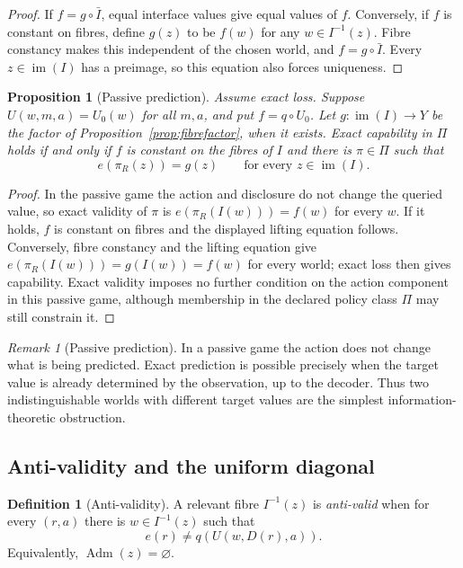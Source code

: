 \documentclass[11pt]{article}
\theoremstyle{plain}
\newtheorem{proposition}[theorem]{Proposition}
\theoremstyle{definition}
\newtheorem{definition}[theorem]{Definition}
\theoremstyle{remark}
\newtheorem{remark}[theorem]{Remark}
\newcommand{\im}{\operatorname{im}}
\newcommand{\Adm}{\operatorname{Adm}}
\begin{document}
\begin{proof}
If $f=g\circ\bar I$, equal interface values give equal values of $f$. Conversely,
if $f$ is constant on fibres, define $g(z)$ to be $f(w)$ for any
$w\in I^{-1}(z)$. Fibre constancy makes this independent of the chosen world,
and $f=g\circ\bar I$. Every $z\in\im(I)$ has a preimage, so this equation also
forces uniqueness.
\end{proof}

\begin{proposition}[Passive prediction]\label{prop:passive}
Assume exact loss. Suppose $U(w,m,a)=U_0(w)$ for all $m,a$, and put $f=q\circ U_0$. Let
$g:\im(I)\to Y$ be the factor of Proposition~\ref{prop:fibrefactor}, when it
exists. Exact capability in $\Pi$ holds if and only if $f$ is constant on the
fibres of $I$ and there is $\pi\in\Pi$ such that
\[
e(\pi_R(z))=g(z)\qquad\text{for every }z\in\im(I).
\]
\end{proposition}

\begin{proof}
In the passive game the action and disclosure do not change the queried value,
so exact validity of $\pi$ is
$e(\pi_R(I(w)))=f(w)$ for every $w$. If it holds, $f$ is constant on fibres and
the displayed lifting equation follows. Conversely, fibre constancy and the
lifting equation give $e(\pi_R(I(w)))=g(I(w))=f(w)$ for every world; exact loss
then gives capability. Exact validity imposes no further condition on the action
component in this passive game, although membership in the declared policy class
$\Pi$ may still constrain it.
\end{proof}

\begin{remark}[Passive prediction]
In a passive game the action does not change what is being predicted. Exact
prediction is possible precisely when the target value is already determined by
the observation, up to the decoder. Thus two indistinguishable worlds with
different target values are the simplest information-theoretic obstruction.
\end{remark}

\subsection{Anti-validity and the uniform diagonal}

\begin{definition}[Anti-validity]\label{def:antivalid}
A relevant fibre $I^{-1}(z)$ is \emph{anti-valid} when for every $(r,a)$ there
is $w\in I^{-1}(z)$ such that
\[
e(r)\ne q(U(w,D(r),a)).
\]
Equivalently, $\Adm(z)=\varnothing$.
\end{definition}
\end{document}
